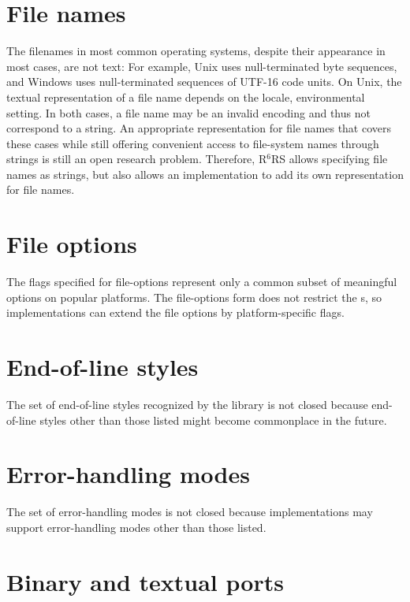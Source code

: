 \documentclass[twoside,twocolumn]{algol60}
\newcommand{\rn}[1]{R$^{#1}$RS}
\begin{document}
\section{File names}
\label{filenamesection}

The filenames in most common operating systems, despite their
appearance in most cases, are not text: For example, Unix uses
null-terminated byte sequences, and Windows uses null-terminated
sequences of UTF-16 code units.  On Unix, the textual representation
of a file name depends on the locale, environmental setting.  In both
cases, a file name may be an invalid encoding and thus not correspond
to a string.  An appropriate representation for file names that covers
these cases while still offering convenient access to file-system
names through strings is still an open research problem.  Therefore,
\rn{6} allows specifying file names as strings, but also allows an
implementation to add its own representation for file names.

\section{File options}

The flags specified for {\cf file-options} represent only a common
subset of meaningful options on popular platforms.  The {\cf
  file-options} form does not restrict the s,
so implementations can extend the file options by platform-specific
flags.

\section{End-of-line styles}

The set of end-of-line styles recognized by the 
library is not closed because end-of-line styles other than those
listed might become commonplace in the future.

\section{Error-handling modes}

The set of error-handling modes is not closed because implementations
may support error-handling modes other than those listed.

\section{Binary and textual ports}
\end{document}
